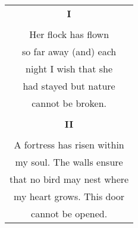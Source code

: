 \documentclass{article}
\begin{document}
\begin{center}
\begin{tabular}{c}
\textbf{I} \\
\\
Her flock has flown \\
so far away (and) each \\
night I wish that she \\
had stayed but nature \\
cannot be broken. \\
\\
\textbf{II} \\
\\
A fortress has risen within \\
my soul.  The walls ensure \\
that no bird may nest where \\
my heart grows.  This door \\
cannot be opened. \\
\end{tabular}
\end{center}
\end{document}
